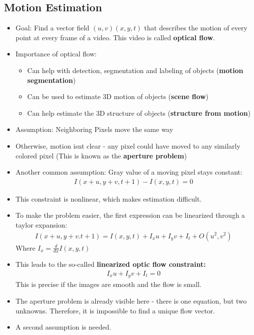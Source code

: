 \documentclass{scrartcl}
\begin{document}
\subsection*{Motion Estimation}
\begin{itemize}
    \item Goal: Find a vector field $(u,v)(x,y,t)$ that describes the motion of every point at every frame of a video. This video is called \textbf{optical flow}.
    \item Importance of optical flow:
    \begin{itemize}
        \item Can help with detection, segmentation and labeling of objects (\textbf{motion segmentation})
        \item Can be used to estimate 3D motion of objects (\textbf{scene flow})
        \item Can help estimate the 3D structure of objects (\textbf{structure from motion})
    \end{itemize}
    \item Assumption: Neighboring Pixels move the same way
    \item Otherwise, motion isnt clear - any pixel could have moved to any similarly colored pixel (This is known as the \textbf{aperture problem})
    \item Another common assumption: Gray value of a moving pixel stays constant:
    \begin{align*}
        I(x+u,y+v,t+1) - I(x,y,t) = 0
    \end{align*}
    \item This constraint is nonlinear, which makes estimation difficult.
    \item To make the problem easier, the first expression can be linearized through a taylor expansion:
    \begin{align*}
        I(x+u,y+v.t+1) = I(x,y,t) + I_x u + I_y v + I_t + O(u^2,v^2)
    \end{align*}
    Where $I_x = \frac{d}{dx}I(x,y,t)$
    \item This leads to the so-called \textbf{linearized optic flow constraint:}
    \begin{align*}
        I_x u + I_y v + I_t = 0
    \end{align*}
    This is precise if the images are smooth and the flow is small.
    \item The aperture problem is already visible here - there is one equation, but two unknowns. Therefore, it is impossible to find a unique flow vector.
    \item A second assumption is needed.

\end{itemize}
\end{document}
